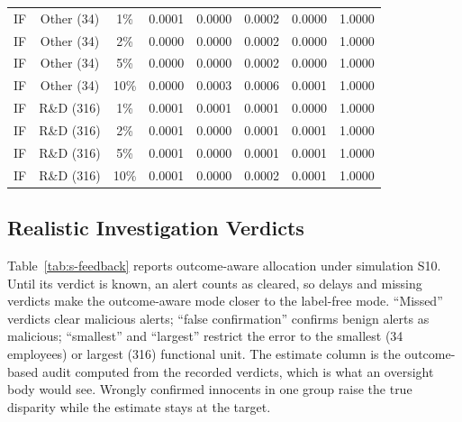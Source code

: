 \documentclass[10pt,onecolumn,letterpaper]{article}
\begin{document}
\begin{table}[!t]
{\begin{tabular}{lccccccc}
IF & Other (34) & 1\% & 0.0001 & 0.0000 & 0.0002 & 0.0000 & 1.0000 \\
IF & Other (34) & 2\% & 0.0000 & 0.0000 & 0.0002 & 0.0000 & 1.0000 \\
IF & Other (34) & 5\% & 0.0000 & 0.0000 & 0.0002 & 0.0000 & 1.0000 \\
IF & Other (34) & 10\% & 0.0000 & 0.0003 & 0.0006 & 0.0001 & 1.0000 \\
IF & R\&D (316) & 1\% & 0.0001 & 0.0001 & 0.0001 & 0.0000 & 1.0000 \\
IF & R\&D (316) & 2\% & 0.0001 & 0.0000 & 0.0001 & 0.0001 & 1.0000 \\
IF & R\&D (316) & 5\% & 0.0001 & 0.0000 & 0.0001 & 0.0001 & 1.0000 \\
IF & R\&D (316) & 10\% & 0.0001 & 0.0000 & 0.0002 & 0.0001 & 1.0000 \\
\bottomrule
\end{tabular}}
\end{table}

\subsection{Realistic Investigation Verdicts}
Table~\ref{tab:s-feedback} reports outcome-aware allocation under simulation S10. Until its verdict is known, an alert counts as cleared, so delays and missing verdicts make the outcome-aware mode closer to the label-free mode. ``Missed'' verdicts clear malicious alerts; ``false confirmation'' confirms benign alerts as malicious; ``smallest'' and ``largest'' restrict the error to the smallest (34 employees) or largest (316) functional unit. The estimate column is the outcome-based audit computed from the recorded verdicts, which is what an oversight body would see. Wrongly confirmed innocents in one group raise the true disparity while the estimate stays at the target.
\end{document}
